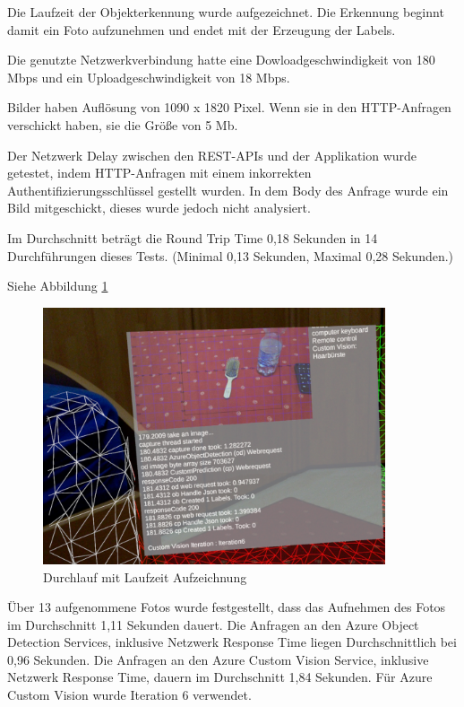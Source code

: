 Die Laufzeit der Objekterkennung wurde aufgezeichnet. Die Erkennung beginnt damit ein Foto aufzunehmen und endet mit der Erzeugung der Labels.

Die genutzte Netzwerkverbindung hatte eine Dowloadgeschwindigkeit von 180 Mbps und ein Uploadgeschwindigkeit von 18 Mbps.

Bilder haben Auflösung von 1090 x 1820 Pixel. Wenn sie in den HTTP-Anfragen verschickt haben, sie die Größe von 5 Mb.

Der Netzwerk Delay zwischen den REST-APIs und der Applikation wurde getestet, indem HTTP-Anfragen mit einem inkorrekten Authentifizierungsschlüssel gestellt wurden. In dem Body des Anfrage wurde ein Bild mitgeschickt, dieses wurde jedoch nicht analysiert. 

Im Durchschnitt beträgt die Round Trip Time 0,18 Sekunden in 14 Durchführungen dieses Tests. (Minimal 0,13 Sekunden, Maximal 0,28 Sekunden.)

Siehe Abbildung \ref{img:laufzeit}

\begin{figure}[H]
	\centering
	\includegraphics[width=0.9\textwidth]{images/ML_20201014_02.30.11.jpg}
	\caption[Laufzeit einer Objekterkennung]{Durchlauf mit Laufzeit Aufzeichnung}
	\label{img:laufzeit}
\end{figure}

Über 13 aufgenommene Fotos wurde festgestellt, dass das Aufnehmen des Fotos im Durchschnitt 1,11 Sekunden dauert. Die Anfragen an den Azure Object Detection Services, inklusive Netzwerk Response Time liegen Durchschnittlich bei 0,96 Sekunden. Die Anfragen an den Azure Custom Vision Service, inklusive Netzwerk Response Time, dauern im Durchschnitt 1,84 Sekunden. Für Azure Custom Vision wurde Iteration 6 verwendet. 

